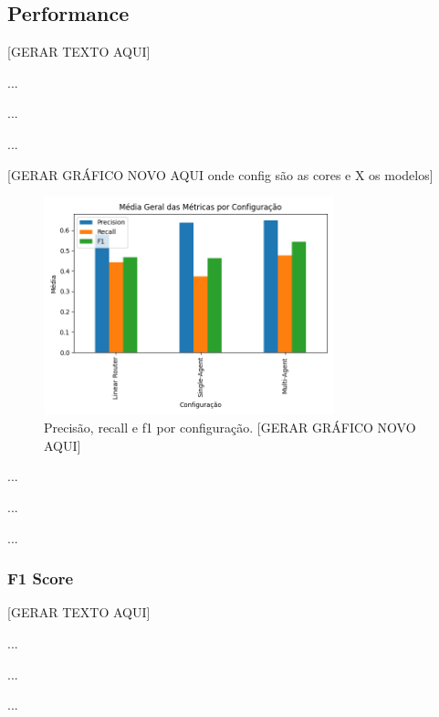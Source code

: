         
        \subsection{Performance}

        
            [GERAR TEXTO AQUI]

            ...

            ...
            
            ...

            [GERAR GRÁFICO NOVO AQUI onde config são as cores e X os modelos]
            
            \begin{figure}[h!]
                \centering              
                \includegraphics[width=0.75\textwidth]{images_part_2/media_geral_por_configuracao.png}
                \caption{Precisão, recall e f1 por configuração.             [GERAR GRÁFICO NOVO AQUI]}
                \label{fig:aaaa}
            \end{figure}


            ...
            
            ...

            ...
        
            \subsubsection{F1 Score}
            
                
                [GERAR TEXTO AQUI]

                ...

                ...

                ...
                

